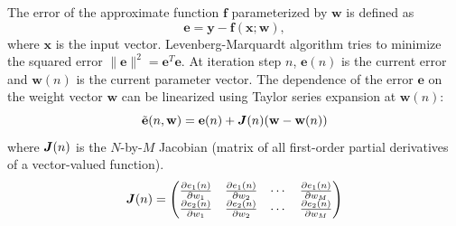 \begin{enumerate}
\begin{solution}



    The error of the approximate function $\mathbf{f}$ parameterized
    by $\mathbf{w}$ is defined as
    \begin{equation*}
      \mathbf{e} = \mathbf{y} - \mathbf{f}(\mathbf{x}; \mathbf{w}),
    \end{equation*}
    where $\mathbf{x}$ is the input vector.  Levenberg-Marquardt
    algorithm tries to minimize the squared error
    $\|\mathbf{e}\|^2=\mathbf{e}^T\mathbf{e}$.  At iteration step $n$,
    $\mathbf{e}(n)$ is the current error and $\mathbf{w}(n)$ is the
    current parameter vector.  The dependence of the error
    $\mathbf{e}$ on the weight vector $\mathbf{w}$ can be linearized
    using Taylor series expansion at $\mathbf{w}(n)$:
    \begin{equation}
      \tilde{{\bf{e}}}(n,{\bf{w}})={\bf{e}}(n)+\boldsymbol{J}(n)({\bf{w}}-{\bf{w}}(n))
      \label{eq:taylor}
    \end{equation}
    where $\boldsymbol{J}(n)$ is the $N$-by-$M$ Jacobian (matrix of all
    first-order partial derivatives of a vector-valued function).
    \[
    \boldsymbol{J}(n)=
    \begin{pmatrix}
      \frac{\partial e_1(n)}{\partial w_1} & \frac{\partial
        e_1(n)}{\partial w_2} & \cdots & \frac{\partial
        e_1(n)}{\partial w_M}
      \\
      \frac{\partial e_2(n)}{\partial w_1} & \frac{\partial
        e_2(n)}{\partial w_2} & \cdots & \frac{\partial
        e_2(n)}{\partial w_M}

\end{pmatrix}\]
\end{solution}
\end{enumerate}
